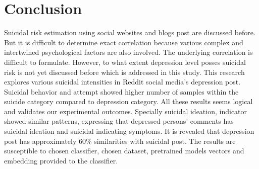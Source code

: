 \documentclass[sn-mathphys,Numbered]{sn-jnl}%
\theoremstyle{thmstyleone}%
\theoremstyle{thmstyletwo}%
\theoremstyle{thmstylethree}%
\begin{document}
\section{Conclusion} 
\label{conclu}
Suicidal risk estimation using social websites and blogs post are discussed before. But it is difficult to determine exact correlation because various complex and intertwined psychological factors are also involved. The underlying correlation is difficult to formulate. However, to what extent depression level posses suicidal risk is not yet discussed before which is addressed in this study. This research explores various suicidal intensities in Reddit social media's depression post. Suicidal behavior and attempt showed higher number of samples within the suicide category compared to depression category. All these results seems logical and validates our experimental outcomes. Specially suicidal ideation, indicator showed similar patterns, expressing that depressed persons' comments has suicidal ideation and suicidal indicating symptoms. It is revealed that depression post has approximately 60\% similarities with suicidal post. The results are susceptible to chosen classifier, chosen dataset, pretrained models vectors and embedding provided to the classifier. 
%
%
%
%
%
%
\end{document}
